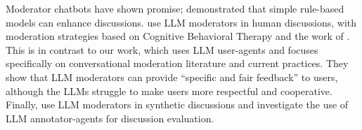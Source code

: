 Moderator chatbots have shown promise; \citet{kim_et_al_chatbot} demonstrated that simple rule-based models can enhance discussions. \citet{cho-etal-2024-language} use \ac{LLM} moderators in human discussions, with moderation strategies based on Cognitive Behavioral Therapy and the work of \citet{rosenberg2015nonviolent}. This is in contrast to our work, which uses \ac{LLM} user-agents and focuses specifically on conversational moderation literature and current practices. They show that \ac{LLM} moderators can provide “specific and fair feedback” to users, although the \acp{LLM} struggle to make users more respectful and cooperative. Finally, \citet{dtsirmpas_thesis} use \ac{LLM} moderators in synthetic discussions and investigate the use of \ac{LLM} annotator-agents for discussion evaluation.
